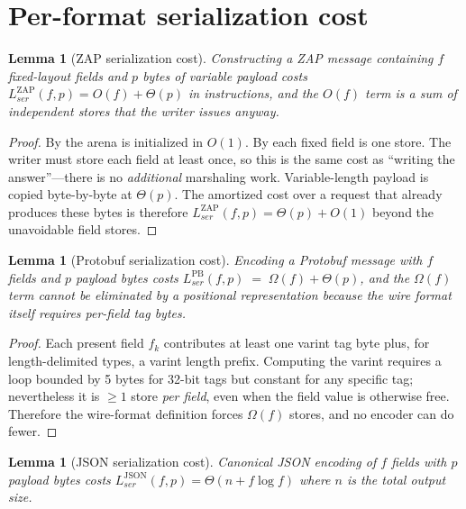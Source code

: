 \documentclass[11pt]{article}
\newtheorem{lemma}[theorem]{Lemma}
\theoremstyle{definition}
\theoremstyle{remark}
\begin{document}
\section{Per-format serialization cost}
\label{sec:performat}

\begin{lemma}[ZAP serialization cost]
\label{lem:zapser}
Constructing a ZAP message containing $f$ fixed-layout fields and $p$
bytes of variable payload costs
$L_{\textit{ser}}^{\mathrm{ZAP}}(f,p) = O(f) + \Theta(p)$
in instructions, and the $O(f)$ term is a sum of independent stores
that the writer issues anyway.
\end{lemma}

\begin{proof}
By  the arena is initialized in $O(1)$. By
 each fixed field is one store. The writer
must store each field at least once, so this is the same cost as
``writing the answer''---there is no \emph{additional} marshaling
work. Variable-length payload is copied byte-by-byte at $\Theta(p)$.
The amortized cost over a request that already produces these bytes
is therefore $L_{\textit{ser}}^{\mathrm{ZAP}}(f,p) = \Theta(p) + O(1)$
beyond the unavoidable field stores.
\end{proof}

\begin{lemma}[Protobuf serialization cost]
\label{lem:pbser}
Encoding a Protobuf message with $f$ fields and $p$ payload bytes
costs $L_{\textit{ser}}^{\mathrm{PB}}(f,p) \;=\; \Omega(f) + \Theta(p)$,
and the $\Omega(f)$ term cannot be eliminated by a positional
representation because the wire format \emph{itself} requires per-field
tag bytes.
\end{lemma}

\begin{proof}
Each present field $f_k$ contributes at least one varint tag byte
plus, for length-delimited types, a varint length prefix. Computing
the varint requires a loop bounded by 5 bytes for 32-bit tags but
constant for any specific tag; nevertheless it is $\geq 1$ store
\emph{per field}, even when the field value is otherwise free.
Therefore the wire-format definition forces $\Omega(f)$ stores, and
no encoder can do fewer.
\end{proof}

\begin{lemma}[JSON serialization cost]
\label{lem:jsonser}
Canonical JSON encoding of $f$ fields with $p$ payload bytes costs
$L_{\textit{ser}}^{\mathrm{JSON}}(f,p) = \Theta(n + f \log f)$ where $n$ is
the total output size.
\end{lemma}
\end{document}
